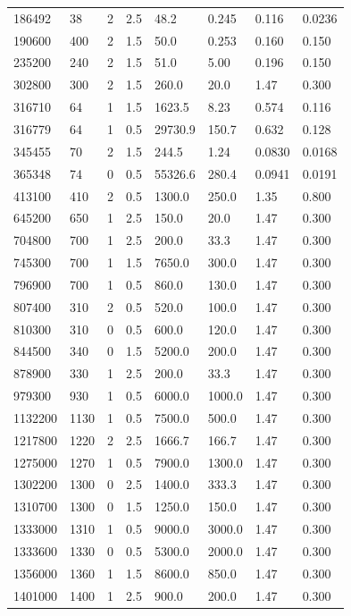 \documentclass[preview]{standalone}
\begin{document}
{{\begin{tabular}{L{1.2cm}C{1.2cm} C{0.3cm}C{0.5cm} C{1.4cm}C{1.4cm} C{1.4cm}C{1.4cm}}
  186492  &    38  & 2     & 2.5 &  48.2  & 0.245  & 0.116 &  0.0236   \\ 
  190600  &   400  & 2     & 1.5 &  50.0  & 0.253  & 0.160 &  0.150   \\ 
  235200  &   240  & 2     & 1.5 &  51.0  & 5.00  & 0.196 &  0.150   \\ 
  302800  &   300  & 2     & 1.5 &  260.0  & 20.0  & 1.47 &  0.300   \\ 
  316710  &    64  & 1     & 1.5 &  1623.5  & 8.23  & 0.574 &  0.116   \\ 
  316779  &    64  & 1     & 0.5 &  29730.9  & 150.7  & 0.632 &  0.128   \\ 
  345455  &    70  & 2     & 1.5 &  244.5  & 1.24  & 0.0830 &  0.0168   \\ 
  365348  &    74  & 0     & 0.5 &  55326.6  & 280.4  & 0.0941 &  0.0191   \\ 
  413100  &   410  & 2     & 0.5 &  1300.0  & 250.0  & 1.35 &  0.800   \\ 
  645200  &   650  & 1     & 2.5 &  150.0  & 20.0  & 1.47 &  0.300   \\ 
  704800  &   700  & 1     & 2.5 &  200.0  & 33.3  & 1.47 &  0.300   \\ 
  745300  &   700  & 1     & 1.5 &  7650.0  & 300.0  & 1.47 &  0.300   \\ 
  796900  &   700  & 1     & 0.5 &  860.0  & 130.0  & 1.47 &  0.300   \\ 
  807400  &   310  & 2     & 0.5 &  520.0  & 100.0  & 1.47 &  0.300   \\ 
  810300  &   310  & 0     & 0.5 &  600.0  & 120.0  & 1.47 &  0.300   \\ 
  844500  &   340  & 0     & 1.5 &  5200.0  & 200.0  & 1.47 &  0.300   \\ 
  878900  &   330  & 1     & 2.5 &  200.0  & 33.3  & 1.47 &  0.300   \\ 
  979300  &   930  & 1     & 0.5 &  6000.0  & 1000.0  & 1.47 &  0.300   \\ 
  1132200  &  1130  & 1     & 0.5 &  7500.0  & 500.0  & 1.47 &  0.300   \\ 
  1217800  &  1220  & 2     & 2.5 &  1666.7  & 166.7  & 1.47 &  0.300   \\ 
  1275000  &  1270  & 1     & 0.5 &  7900.0  & 1300.0  & 1.47 &  0.300   \\ 
  1302200  &  1300  & 0     & 2.5 &  1400.0  & 333.3  & 1.47 &  0.300   \\ 
  1310700  &  1300  & 0     & 1.5 &  1250.0  & 150.0  & 1.47 &  0.300   \\ 
  1333000  &  1310  & 1     & 0.5 &  9000.0  & 3000.0  & 1.47 &  0.300   \\ 
  1333600  &  1330  & 0     & 0.5 &  5300.0  & 2000.0  & 1.47 &  0.300   \\ 
  1356000  &  1360  & 1     & 1.5 &  8600.0  & 850.0  & 1.47 &  0.300   \\ 
  1401000  &  1400  & 1     & 2.5 &  900.0  & 200.0  & 1.47 &  0.300   \\ 
\hline 
\end{tabular} 

}}
\end{document}
